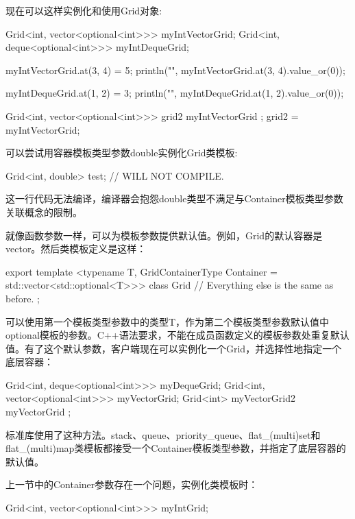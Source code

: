 现在可以这样实例化和使用Grid对象:

\begin{cpp}
Grid<int, vector<optional<int>>> myIntVectorGrid;
Grid<int, deque<optional<int>>> myIntDequeGrid;

myIntVectorGrid.at(3, 4) = 5;
println("{}", myIntVectorGrid.at(3, 4).value_or(0));

myIntDequeGrid.at(1, 2) = 3;
println("{}", myIntDequeGrid.at(1, 2).value_or(0));

Grid<int, vector<optional<int>>> grid2 { myIntVectorGrid };
grid2 = myIntVectorGrid;
\end{cpp}

可以尝试用容器模板类型参数double实例化Grid类模板:

\begin{cpp}
Grid<int, double> test; // WILL NOT COMPILE.
\end{cpp}

这一行代码无法编译，编译器会抱怨double类型不满足与Container模板类型参数关联概念的限制。

就像函数参数一样，可以为模板参数提供默认值。例如，Grid的默认容器是vector。然后类模板定义是这样：

\begin{cpp}
export template <typename T,
    GridContainerType Container = std::vector<std::optional<T>>>
class Grid
{
    // Everything else is the same as before.
};
\end{cpp}

可以使用第一个模板类型参数中的类型T，作为第二个模板类型参数默认值中optional模板的参数。C++语法要求，不能在成员函数定义的模板参数处重复默认值。有了这个默认参数，客户端现在可以实例化一个Grid，并选择性地指定一个底层容器：

\begin{cpp}
Grid<int, deque<optional<int>>> myDequeGrid;
Grid<int, vector<optional<int>>> myVectorGrid;
Grid<int> myVectorGrid2 { myVectorGrid };
\end{cpp}

标准库使用了这种方法。stack、queue、priority\_queue、flat\_(multi)set和flat\_(multi)map类模板都接受一个Container模板类型参数，并指定了底层容器的默认值。


上一节中的Container参数存在一个问题，实例化类模板时：

\begin{cpp}
Grid<int, vector<optional<int>>> myIntGrid;
\end{cpp}

